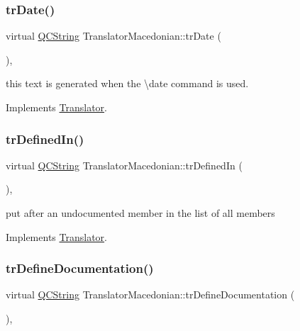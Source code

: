 \mbox{\label{class_translator_macedonian_a26ce585807600c35aa9fe48eaff9d4f3}} 
\subsubsection{\texorpdfstring{trDate()}{trDate()}}
{\footnotesize\ttfamily virtual \mbox{\hyperlink{class_q_c_string}{Q\+C\+String}} Translator\+Macedonian\+::tr\+Date (\begin{DoxyParamCaption}{ }\end{DoxyParamCaption})\hspace{0.3cm}{\ttfamily [inline]}, {\ttfamily [virtual]}}

this text is generated when the \textbackslash{}date command is used. 

Implements \mbox{\hyperlink{class_translator}{Translator}}.

\mbox{\label{class_translator_macedonian_acdb21ee9ddeede3503c659668b93a52b}} 
\subsubsection{\texorpdfstring{trDefinedIn()}{trDefinedIn()}}
{\footnotesize\ttfamily virtual \mbox{\hyperlink{class_q_c_string}{Q\+C\+String}} Translator\+Macedonian\+::tr\+Defined\+In (\begin{DoxyParamCaption}{ }\end{DoxyParamCaption})\hspace{0.3cm}{\ttfamily [inline]}, {\ttfamily [virtual]}}

put after an undocumented member in the list of all members 

Implements \mbox{\hyperlink{class_translator}{Translator}}.

\mbox{\label{class_translator_macedonian_a8e98211615de4c839fabddafe8fbcbf9}} 
\subsubsection{\texorpdfstring{trDefineDocumentation()}{trDefineDocumentation()}}
{\footnotesize\ttfamily virtual \mbox{\hyperlink{class_q_c_string}{Q\+C\+String}} Translator\+Macedonian\+::tr\+Define\+Documentation (\begin{DoxyParamCaption}{ }\end{DoxyParamCaption})\hspace{0.3cm}{\ttfamily [inline]}, {\ttfamily [virtual]}}

